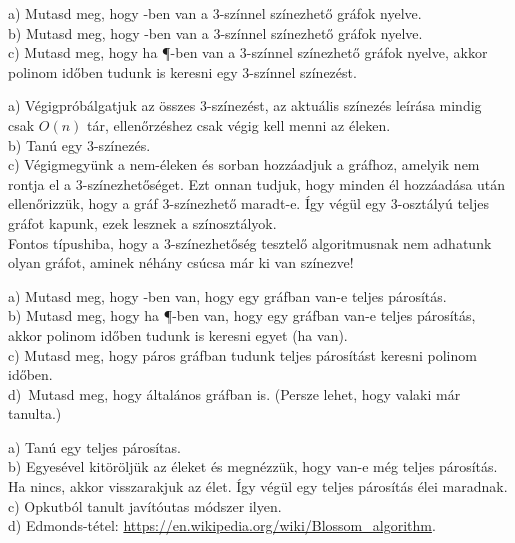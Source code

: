 \begin{Exercise}[counter={sorszam}, difficulty=0]
	a) Mutasd meg, hogy \PSPACE-ben van a $3$-sz\'innel sz\'inezhet\H o gr\'afok nyelve.\\
	b) Mutasd meg, hogy \NP-ben van a $3$-sz\'innel sz\'inezhet\H o gr\'afok nyelve.\\
	c) Mutasd meg, hogy ha \P-ben van a $3$-sz\'innel sz\'inezhet\H o gr\'afok nyelve, akkor polinom id\H oben tudunk is keresni egy $3$-sz\'innel sz\'inez\'est.	
\end{Exercise}	
\begin{Answer}
	a) V\'egigpr\'ob\'algatjuk az \"osszes $3$-sz\'inez\'est, az aktu\'alis sz\'inez\'es le\'ir\'asa mindig csak $O(n)$ t\'ar, ellen\H orz\'eshez csak v\'egig kell menni az \'eleken.\\
	b) Tan\'u egy $3$-sz\'inez\'es.\\
	c) V\'egigmegy\"unk a nem-\'eleken \'es sorban hozz\'aadjuk a gr\'afhoz, amelyik nem rontja el a $3$-sz\'inezhet\H os\'eget. Ezt onnan tudjuk, hogy minden \'el hozz\'aad\'asa ut\'an ellen\H orizz\"uk, hogy a gr\'af $3$-sz\'inezhet\H o maradt-e. \'Igy v\'eg\"ul egy $3$-oszt\'aly\'u teljes gr\'afot kapunk, ezek lesznek a sz\'inoszt\'alyok.\\
	Fontos t\'ipushiba, hogy a $3$-sz\'inezhet\H os\'eg tesztel\H o algoritmusnak nem adhatunk olyan gr\'afot, aminek n\'eh\'any cs\'ucsa m\'ar ki van sz\'inezve!
\end{Answer}




\begin{Exercise}[counter={sorszam}, difficulty=0]
	a) Mutasd meg, hogy \NP-ben van, hogy egy gr\'afban van-e teljes p\'aros\'it\'as.\\
	b) Mutasd meg, hogy ha \P-ben van, hogy egy gr\'afban van-e teljes p\'aros\'it\'as, akkor polinom id\H oben tudunk is keresni egyet (ha van).\\
	c) Mutasd meg, hogy p\'aros gr\'afban tudunk teljes p\'aros\'it\'ast keresni polinom id\H oben.\\
	d)~\veryhard Mutasd meg, hogy \'altal\'anos gr\'afban is. (Persze lehet, hogy valaki m\'ar tanulta.)
\end{Exercise}	
\begin{Answer}
	a) Tan\'u egy teljes p\'aros\'itas.\\
	b) Egyes\'evel kit\"or\"olj\"uk az \'eleket \'es megn\'ezz\"uk, hogy van-e m\'eg teljes p\'aros\'it\'as. Ha nincs, akkor visszarakjuk az \'elet. \'Igy v\'eg\"ul egy teljes p\'aros\'it\'as \'elei maradnak.\\
	c) Opkutb\'ol tanult jav\'it\'outas m\'odszer ilyen.\\
	d) Edmonds-t\'etel: \url{https://en.wikipedia.org/wiki/Blossom_algorithm}.
\end{Answer}




